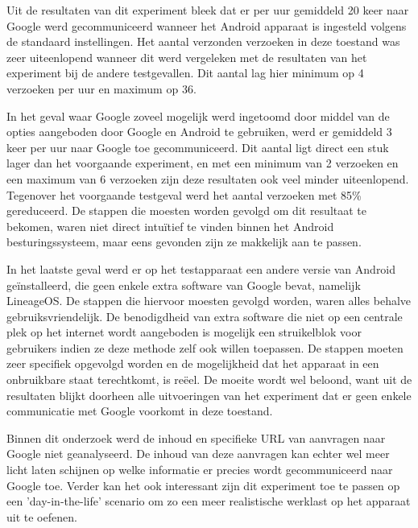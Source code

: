 Uit de resultaten van dit experiment bleek dat er per uur gemiddeld 20 keer naar Google werd gecommuniceerd wanneer het Android apparaat is ingesteld volgens de standaard instellingen. Het aantal verzonden verzoeken in deze toestand was zeer uiteenlopend wanneer dit werd vergeleken met de resultaten van het experiment bij de andere testgevallen. Dit aantal lag hier minimum op 4 verzoeken per uur en maximum op 36.

In het geval waar Google zoveel mogelijk werd ingetoomd door middel van de opties aangeboden door Google en Android te gebruiken, werd er gemiddeld 3 keer per uur naar Google toe gecommuniceerd. Dit aantal ligt direct een stuk lager dan het voorgaande experiment, en met een minimum van 2 verzoeken en een maximum van 6 verzoeken zijn deze resultaten ook veel minder uiteenlopend. Tegenover het voorgaande testgeval werd het aantal verzoeken met 85\% gereduceerd. De stappen die moesten worden gevolgd om dit resultaat te bekomen, waren niet direct intuïtief te vinden binnen het Android besturingssysteem, maar eens gevonden zijn ze makkelijk aan te passen.

In het laatste geval werd er op het testapparaat een andere versie van Android geïnstalleerd, die geen enkele extra software van Google bevat, namelijk LineageOS. De stappen die hiervoor moesten gevolgd worden, waren alles behalve gebruiksvriendelijk. De benodigdheid van extra software die niet op een centrale plek op het internet wordt aangeboden is mogelijk een struikelblok voor gebruikers indien ze deze methode zelf ook willen toepassen. De stappen moeten zeer specifiek opgevolgd worden en de mogelijkheid dat het apparaat in een onbruikbare staat terechtkomt, is reëel. De moeite wordt wel beloond, want uit de resultaten blijkt doorheen alle uitvoeringen van het experiment dat er geen enkele communicatie met Google voorkomt in deze toestand.

Binnen dit onderzoek werd de inhoud en specifieke URL van aanvragen naar Google niet geanalyseerd. De inhoud van deze aanvragen kan echter wel meer licht laten schijnen op welke informatie er precies wordt gecommuniceerd naar Google toe. Verder kan het ook interessant zijn dit experiment toe te passen op een 'day-in-the-life' scenario om zo een meer realistische werklast op het apparaat uit te oefenen.
